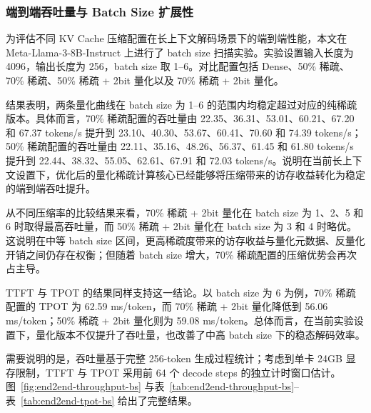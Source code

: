 \subsubsection{端到端吞吐量与 Batch Size 扩展性}

为评估不同 KV Cache 压缩配置在长上下文解码场景下的端到端性能，本文在 Meta-Llama-3-8B-Instruct 上进行了 batch size 扫描实验。实验设置输入长度为 4096，输出长度为 256，batch size 取 1--6。对比配置包括 Dense、50\% 稀疏、70\% 稀疏、50\% 稀疏 + 2bit 量化以及 70\% 稀疏 + 2bit 量化。

结果表明，两条量化曲线在 batch size 为 1--6 的范围内均稳定超过对应的纯稀疏版本。具体而言，70\% 稀疏配置的吞吐量由 22.35、36.31、53.01、60.21、67.20 和 67.37 tokens/s 提升到 23.10、40.30、53.67、60.41、70.60 和 74.39 tokens/s；50\% 稀疏配置的吞吐量由 22.11、35.16、48.26、56.37、61.45 和 61.80 tokens/s 提升到 22.44、38.32、55.05、62.61、67.91 和 72.03 tokens/s。说明在当前长上下文设置下，优化后的量化稀疏计算核心已经能够将压缩带来的访存收益转化为稳定的端到端吞吐提升。

从不同压缩率的比较结果来看，70\% 稀疏 + 2bit 量化在 batch size 为 1、2、5 和 6 时取得最高吞吐量，而 50\% 稀疏 + 2bit 量化在 batch size 为 3 和 4 时略优。这说明在中等 batch size 区间，更高稀疏度带来的访存收益与量化元数据、反量化开销之间仍存在权衡；但随着 batch size 增大，70\% 稀疏配置的压缩优势会再次占主导。

TTFT 与 TPOT 的结果同样支持这一结论。以 batch size 为 6 为例，70\% 稀疏配置的 TPOT 为 62.59 ms/token，而 70\% 稀疏 + 2bit 量化降低到 56.06 ms/token；50\% 稀疏 + 2bit 量化则为 59.08 ms/token。总体而言，在当前实验设置下，量化版本不仅提升了吞吐量，也改善了中高 batch size 下的稳态解码效率。

需要说明的是，吞吐量基于完整 256-token 生成过程统计；考虑到单卡 24GB 显存限制，TTFT 与 TPOT 采用前 64 个 decode steps 的独立计时窗口估计。图~\ref{fig:end2end-throughput-bs} 与表~\ref{tab:end2end-throughput-bs}--表~\ref{tab:end2end-tpot-bs} 给出了完整结果。
